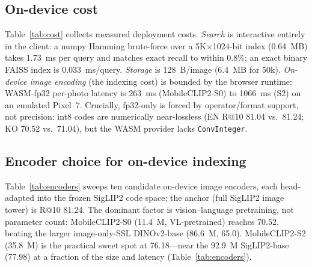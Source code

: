 \documentclass[letterpaper]{article} %
\newcommand{\verify}[1]{\textbf{[VERIFY: #1]}}
\begin{document}
\subsection{On-device cost}
Table~\ref{tab:cost} collects measured deployment costs. \emph{Search} is interactive entirely in
the client: a numpy Hamming brute-force over a 5K$\times$1024-bit index (0.64~MB) takes 1.73~ms per
query and matches exact recall to within 0.8\%; an exact binary FAISS index is 0.033~ms/query.
\emph{Storage} is 128~B/image (6.4~MB for 50k). \emph{On-device image encoding} (the indexing cost)
is bounded by the browser runtime: WASM-fp32 per-photo latency is 263~ms (MobileCLIP2-S0) to 1066~ms
(S2) on an emulated Pixel~7. Crucially, fp32-only is forced by operator/format support, not
precision: int8 codes are numerically near-lossless (EN R@10 81.04 vs.\ 81.24; KO 70.52 vs.\ 71.04),
but the WASM provider lacks \texttt{ConvInteger}.

\begin{table}[t]
\centering\small
{}
\caption{Measured on-device costs. Search index is 5K images; a 50k extrapolation
(\,$\approx$0.33/15 ms\,) is \protect\verify{not directly benchmarked at 50k}. Browser text-query
latency \protect\verify{not measured in repo CSVs}.}
\label{tab:cost}
\end{table}

\subsection{Encoder choice for on-device indexing}
Table~\ref{tab:encoders} sweeps ten candidate on-device image encoders, each head-adapted into the
frozen SigLIP2 code space; the anchor (full SigLIP2 image tower) is R@10 81.24. The dominant factor
is vision--language pretraining, not parameter count: MobileCLIP2-S0 (11.4~M, VL-pretrained) reaches
70.52, beating the larger image-only-SSL DINOv2-base (86.6~M, 65.0). MobileCLIP2-S2 (35.8~M) is the
practical sweet spot at 76.18---near the 92.9~M SigLIP2-base (77.98) at a fraction of the size and
latency (Table~\ref{tab:encoders}).
\end{document}
